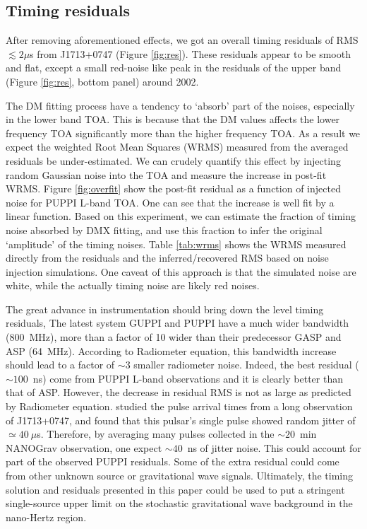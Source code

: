 \subsection{Timing residuals}
\label{sec:res}

After removing aforementioned effects, we got an overall timing residuals of RMS $\lesssim 2\mu$s from J1713+0747 (Figure \ref{fig:res}).
These residuals appear to be smooth and flat, except a small red-noise like
peak in the residuals of the upper band (Figure \ref{fig:res}, bottom panel) around 2002. 

The DM fitting process have a tendency to
`absorb' part of the noises, especially in the lower band TOA. This is because
that the DM values affects the lower frequency TOA significantly more than the
higher frequency TOA. 
As a result we expect the weighted Root Mean Squares (WRMS) measured from the
averaged residuals be under-estimated. We can crudely quantify
this effect by injecting random Gaussian noise into the TOA and
measure the increase in post-fit WRMS. Figure \ref{fig:overfit} show
the post-fit residual as a function of injected noise for PUPPI L-band TOA. 
One can see that the increase is well fit by a linear function. 
Based on this experiment, we
can estimate the fraction of timing noise absorbed by DMX fitting, and use
this fraction to infer the original `amplitude' of the timing noises. 
Table \ref{tab:wrms} shows the WRMS measured directly from the residuals and 
the inferred/recovered RMS based on noise injection simulations. One caveat 
of this approach is that the simulated noise are white, while the actually timing
noise are likely red noises. 


The great advance in instrumentation should bring down the level timing residuals,
The latest system GUPPI and PUPPI have a much wider bandwidth (800~MHz), more than
a factor of 10 wider than their predecessor GASP and ASP (64~MHz). According to Radiometer 
equation, this bandwidth increase should lead to a factor of $\sim3$
smaller radiometer noise. 
Indeed, the best residual ($\sim100$~ns) come from PUPPI L-band observations and it is clearly better than that of ASP. However, the decrease in residual RMS is not as large as predicted by Radiometer equation.
\citet{sc12} studied the pulse arrival times from a long observation of
J1713+0747, and found that this pulsar's single pulse showed random jitter of
$\simeq40~\mu$s. Therefore, by averaging many pulses collected in the
$\sim20$~min NANOGrav observation, one expect $\sim 40$~ns of jitter noise. 
This could account for part of the observed PUPPI residuals.
Some of the extra residual could come from other unknown source or gravitational wave signals.
Ultimately, the timing solution and residuals presented in this paper could be used to put a stringent single-source upper limit on the stochastic gravitational wave background in the nano-Hertz region.



